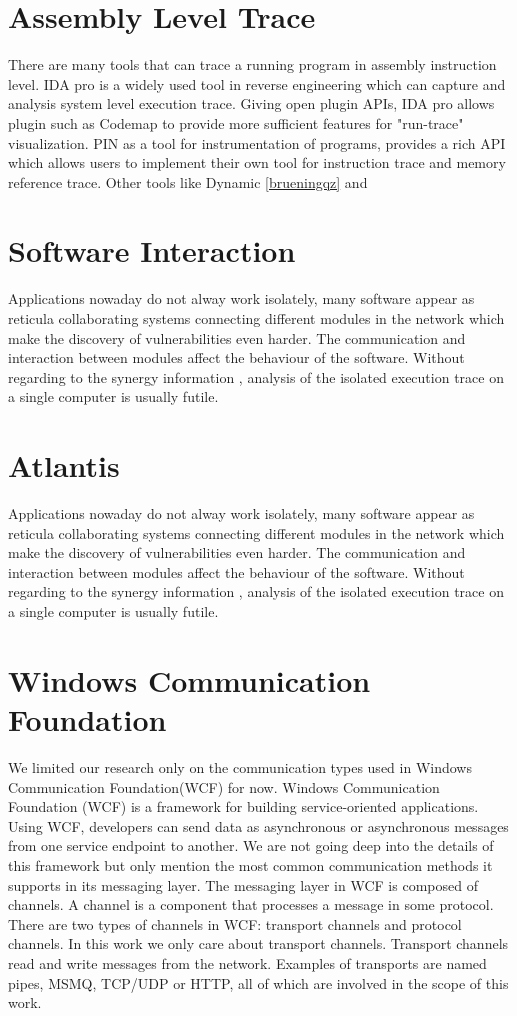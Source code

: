 \section{Assembly Level Trace}
There are many tools that can trace a running program in assembly instruction level.  IDA pro \cite{eagle_ida_2008} is a widely used tool in reverse engineering which can capture and analysis system level execution trace. Giving open plugin APIs, IDA pro allows plugin such as Codemap \cite{_c0demap/codemap:_????} to provide more sufficient features for "run-trace" visualization. PIN\cite{_pin_????} as a tool for instrumentation of programs, provides a rich API which allows users to implement their own tool for instruction trace and memory reference trace. Other tools like Dynamic \ref{brueningqz} and 
\section{Software Interaction}
Applications nowaday do not alway work isolately,  many software  appear as  reticula collaborating systems connecting different modules in the network\cite{PhysRevE.68.046116} which make the discovery of vulnerabilities even harder. The communication and interaction between modules affect the behaviour of the software. Without regarding to the synergy information , analysis of the isolated execution trace on a single computer is usually futile. 

\section{Atlantis}
Applications nowaday do not alway work isolately,  many software  appear as  reticula collaborating systems connecting different modules in the network\cite{PhysRevE.68.046116} which make the discovery of vulnerabilities even harder. The communication and interaction between modules affect the behaviour of the software. Without regarding to the synergy information , analysis of the isolated execution trace on a single computer is usually futile. 

\section{Windows Communication Foundation}
We limited our research only on the communication types used in Windows Communication Foundation(WCF) for now. Windows Communication Foundation (WCF) is a framework for building service-oriented applications. Using WCF, developers can send data as asynchronous or asynchronous messages from one service endpoint to another. We are not going deep into the details of this framework but only mention the most common communication methods it supports in its messaging layer. The messaging layer in WCF is composed of channels. A channel is a component that processes a message in some protocol. There are two types of channels in WCF: transport channels and protocol channels. In this work we only care about transport channels. Transport channels read and write messages from the network. Examples of transports are named pipes, MSMQ, TCP/UDP or HTTP, all of which are involved in the scope of this work.

